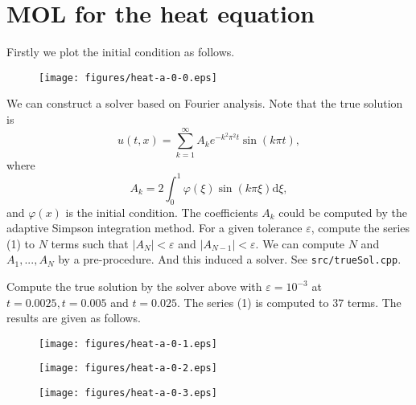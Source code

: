 \documentclass[twocolumn,10pt]{article}
\begin{document}
\section{\large MOL for the heat equation}

\;\;\;\;Firstly we plot the initial condition as follows.

\vspace{-.3em}\begin{figure}[H]
    \centering
    \begin{minipage}[t]{0.4\linewidth}
        \centering
        \texttt{[image: figures/heat-a-0-0.eps]}
    \end{minipage}
\end{figure} \vspace{-.5em}

We can construct a solver based on Fourier analysis. Note that the true solution is
\begin{equation}
    u(t,x)=\sum_{k=1}^\infty A_k e^{-k^2\pi^2t}\sin(k\pi t),
\end{equation}
where
\begin{equation*}
    A_k=2\int_0^1 \varphi(\xi)\sin(k\pi\xi) \text{d}\xi,
\end{equation*}
and $\varphi(x)$ is the initial condition. The coefficients $A_k$ could be computed by the adaptive Simpson integration method. For a given tolerance $\varepsilon$, compute the series (1) to $N$ terms such that $|A_N|<\varepsilon$ and $|A_{N-1}|<\varepsilon$. We can compute $N$ and $A_1,...,A_N$ by a pre-procedure. And this induced a solver. See \verb|src/trueSol.cpp|.

Compute the true solution by the solver above with $\varepsilon=10^{-3}$ at $t=0.0025,t=0.005$ and $t=0.025$. The series (1) is computed to $37$ terms. The results are given as follows.

\vspace{-.3em}\begin{figure}[H]
    \centering
    \begin{minipage}[t]{0.32\linewidth}
        \centering
        \texttt{[image: figures/heat-a-0-1.eps]}
    \end{minipage}
    \begin{minipage}[t]{0.32\linewidth}
        \centering
        \texttt{[image: figures/heat-a-0-2.eps]}
    \end{minipage}
    \begin{minipage}[t]{0.32\linewidth}
        \centering
        \texttt{[image: figures/heat-a-0-3.eps]}
    \end{minipage}
\end{figure} \vspace{-.5em}
\end{document}
